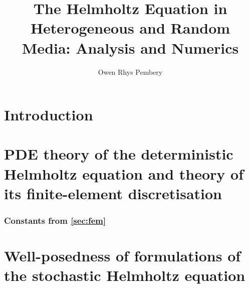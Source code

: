 \documentclass[11pt]{book}
\title{The Helmholtz Equation in Heterogeneous and Random Media: Analysis and Numerics}
\author{Owen Rhys Pembery}
\begin{document}


\maketitle

\makeaftertitle





\tableofcontents

\listoffigures
\listoftables
\listofalgorithms

\chapter{Introduction}\label{chap:intro}


\chapter{PDE theory of the deterministic Helmholtz equation and theory of its finite-element discretisation}\label{chap:background}





\subsection{Constants from \cref{sec:fem}}\label{app:constants}


%

%

\chapter{Well-posedness of formulations of the stochastic Helmholtz equation}\label{chap:stochastic}

 








\end{document}
